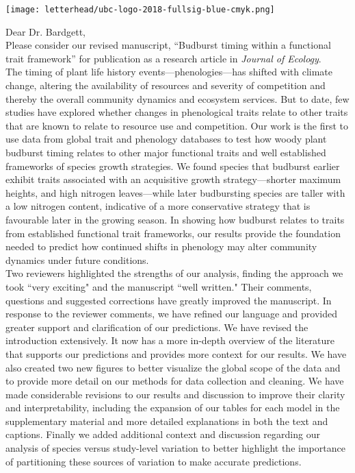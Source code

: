 \documentclass[11pt,a4paper]{article}
\begin{document}
\noindent \texttt{[image: letterhead/ubc-logo-2018-fullsig-blue-cmyk.png]}

\noindent Dear Dr. Bardgett,
\vspace{1.5ex}\\
\noindent Please consider our revised manuscript, ``Budburst timing within a functional trait framework'' for publication as a research article in \emph{Journal of Ecology}. 
\vspace{1.5ex}\\ 
\noindent The timing of plant life history events---phenologies---has shifted with climate change, altering the availability of resources and severity of competition and thereby the overall community dynamics and ecosystem services. But to date, few studies have explored whether changes in phenological traits relate to other traits that are known to relate to resource use and competition. Our work is the first to use data from global trait and phenology databases to test how woody plant budburst timing relates to other major functional traits and well established frameworks of species growth strategies. We found species that budburst earlier exhibit traits associated with an acquisitive growth strategy---shorter maximum heights, and high nitrogen leaves---while later budbursting species are taller with a low nitrogen content, indicative of a more conservative strategy that is favourable later in the growing season. In showing how budburst relates to traits from established functional trait frameworks, our results provide the foundation needed to predict how continued shifts in phenology may alter community dynamics under future conditions. 
\vspace{1.5ex}\\ 
Two reviewers highlighted the strengths of our analysis, finding the approach we took ``very exciting" and the manuscript ``well written." Their comments, questions and suggested corrections have greatly improved the manuscript. In response to the reviewer comments, we have refined our language and provided greater support and clarification of our predictions. We have revised the introduction extensively. It now has a more in-depth overview of the literature that supports our predictions and provides more context for our results. We have also created two new figures to better visualize the global scope of the data and to provide more detail on our methods for data collection and cleaning. We have made considerable revisions to our results and discussion to improve their clarity and interpretability, including the expansion of our tables for each model in the supplementary material and more detailed explanations in both the text and captions. Finally we added additional context and discussion regarding our analysis of species versus study-level variation to better highlight the importance of partitioning these sources of variation to make accurate predictions.
\end{document}
